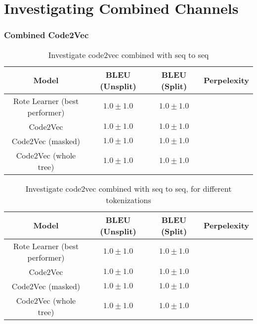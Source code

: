 \section{Investigating Combined Channels} %
\label{sec:investigating_combined_channels}

\subsubsection{Combined Code2Vec } %
\label{ssub:comparing_code2vec_altered}


\begin{table}[h!]
\begin{center}
\begin{tabular}{ c | c | c | c }
    Model                             & BLEU (Unsplit)  & BLEU (Split)    & Perpelexity \\
    \hline
    Rote Learner (best performer)           & $1.0 \pm 1.0 $  & $1.0 \pm 1.0 $  & \\
    \hline
    Code2Vec                             & $1.0 \pm 1.0 $  & $1.0 \pm 1.0 $  &  \\
    Code2Vec (masked)                    & $1.0 \pm 1.0 $  & $1.0 \pm 1.0 $  &  \\
    Code2Vec (whole tree)                & $1.0 \pm 1.0 $  & $1.0 \pm 1.0 $  &  \\
    \hline
\end{tabular}
\caption {Investigate code2vec combined with seq to seq}
\label{table:name_baseline}
\end{center}
\end{table}




\begin{table}[h!]
\begin{center}
\begin{tabular}{ c | c | c | c }
    Model                             & BLEU (Unsplit)  & BLEU (Split)    & Perpelexity \\
    \hline
    Rote Learner (best performer)           & $1.0 \pm 1.0 $  & $1.0 \pm 1.0 $  & \\
    \hline
    Code2Vec                             & $1.0 \pm 1.0 $  & $1.0 \pm 1.0 $  &  \\
    Code2Vec (masked)                    & $1.0 \pm 1.0 $  & $1.0 \pm 1.0 $  &  \\
    Code2Vec (whole tree)                & $1.0 \pm 1.0 $  & $1.0 \pm 1.0 $  &  \\
    \hline
\end{tabular}
\caption {Investigate code2vec combined with seq to seq, for different tokenizations}
\label{table:name_baseline}
\end{center}
\end{table}


